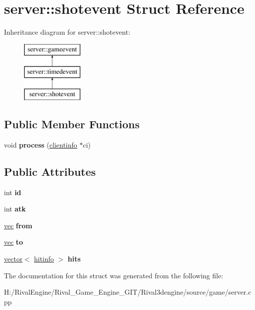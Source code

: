 \hypertarget{structserver_1_1shotevent}{}\section{server\+:\+:shotevent Struct Reference}
\label{structserver_1_1shotevent}
Inheritance diagram for server\+:\+:shotevent\+:\begin{figure}[H]
\begin{center}
\leavevmode
\includegraphics[height=3.000000cm]{structserver_1_1shotevent}
\end{center}
\end{figure}
\subsection*{Public Member Functions}
\begin{DoxyCompactItemize}
\item 
\mbox{\label{structserver_1_1shotevent_a791cac082ddaff7b86aa0268f9b3080d}} 
void {\bfseries process} (\hyperlink{structserver_1_1clientinfo}{clientinfo} $\ast$ci)
\end{DoxyCompactItemize}
\subsection*{Public Attributes}
\begin{DoxyCompactItemize}
\item 
\mbox{\label{structserver_1_1shotevent_ade90ac717d1aeabf2ce6be2d0b2a38c3}} 
int {\bfseries id}
\item 
\mbox{\label{structserver_1_1shotevent_a8254e54dc411d5e910a7a6a627ba2526}} 
int {\bfseries atk}
\item 
\mbox{\label{structserver_1_1shotevent_af7b0ecafcb275f38de466f4f0bd0cee3}} 
\hyperlink{structvec}{vec} {\bfseries from}
\item 
\mbox{\label{structserver_1_1shotevent_a77287643e64fdbc32177f2af645ce10f}} 
\hyperlink{structvec}{vec} {\bfseries to}
\item 
\mbox{\label{structserver_1_1shotevent_a570352829eeefdd4bf01382dce3e562d}} 
\hyperlink{structvector}{vector}$<$ \hyperlink{structserver_1_1hitinfo}{hitinfo} $>$ {\bfseries hits}
\end{DoxyCompactItemize}


The documentation for this struct was generated from the following file\+:\begin{DoxyCompactItemize}
\item 
H\+:/\+Rival\+Engine/\+Rival\+\_\+\+Game\+\_\+\+Engine\+\_\+\+G\+I\+T/\+Rival3dengine/source/game/server.\+cpp\end{DoxyCompactItemize}
